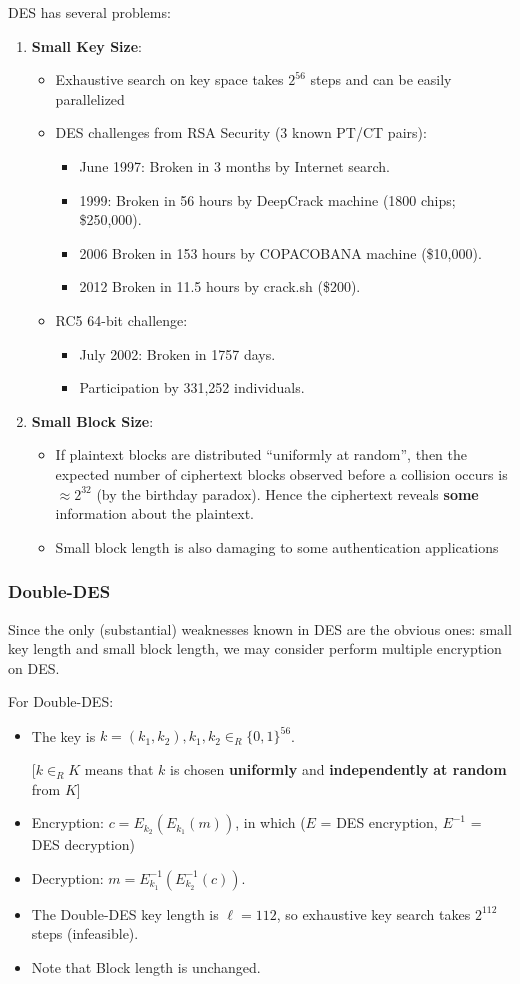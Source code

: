 \documentclass[12pt,titlepage]{article}
\begin{document}
DES has several problems: \begin{enumerate}
\item \textbf{Small Key Size}: \begin{itemize}
\item Exhaustive search on key space takes $2^{56}$ steps and can be easily parallelized
\item DES challenges from RSA Security (3 known PT/CT pairs): \begin{itemize}
\item June 1997: Broken in 3 months by Internet search. 
\item 1999: Broken in 56 hours by DeepCrack machine (1800 chips; \$250,000). 
\item 2006 Broken in 153 hours by COPACOBANA machine (\$10,000). \item 2012 Broken in 11.5 hours by crack.sh (\$200).
\end{itemize}
\item RC5 64-bit challenge: \begin{itemize}
\item July 2002: Broken in 1757 days.
\item Participation by 331,252 individuals.
\end{itemize}
\end{itemize}
\item \textbf{Small Block Size}: \begin{itemize}
\item If plaintext blocks are distributed ``uniformly at random'', then the expected number of ciphertext blocks observed before a collision occurs is $\approx 2^{32}$ (by the birthday paradox). Hence the ciphertext reveals \textbf{some} information about the plaintext.
\item Small block length is also damaging to some authentication applications
\end{itemize}
\end{enumerate}

\subsubsection{Double-DES}
Since the only (substantial) weaknesses known in DES are the obvious ones: small key length and small block length, we may consider perform multiple encryption on DES. 

For Double-DES: \begin{itemize}
\item The key is $k = (k_1, k_2), k_1, k_2 \in_R \{0, 1\}^{56}$. 
	
[$k \in_R K$ means that $k$ is chosen \textbf{uniformly} and \textbf{independently} \textbf{at random} from $K$]
\item Encryption: $c = E_{k_2} (E_{k_1} (m))$, in which ($E$ = DES encryption, $E^{-1}$ = DES decryption)
\item Decryption: $m = E_{k_1}^{-1} (E_{k_2}^{-1} (c))$.
\item The Double-DES key length is $\ell = 112$, so exhaustive key search takes $2^{112}$ steps (infeasible).
\item Note that Block length is unchanged.
\end{itemize}
\end{document}
